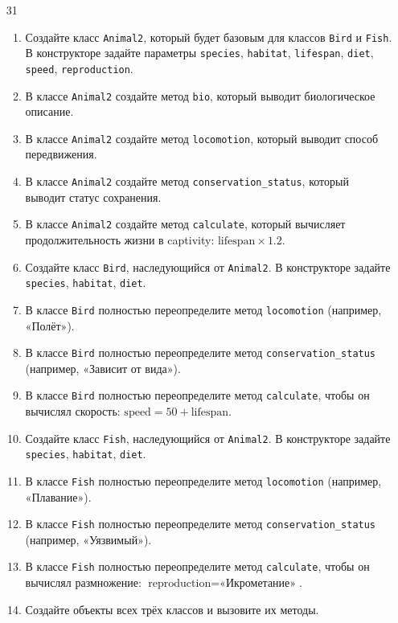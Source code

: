 \begin{enumerate}
\begin{enumerate}
\end{enumerate}
\item[31]
\begin{enumerate}
    \item Создайте класс \texttt{Animal2}, который будет базовым для классов \texttt{Bird} и \texttt{Fish}. В конструкторе задайте параметры \texttt{species}, \texttt{habitat}, \texttt{lifespan}, \texttt{diet}, \texttt{speed}, \texttt{reproduction}.
    \item В классе \texttt{Animal2} создайте метод \texttt{bio}, который выводит биологическое описание.
    \item В классе \texttt{Animal2} создайте метод \texttt{locomotion}, который выводит способ передвижения.
    \item В классе \texttt{Animal2} создайте метод \texttt{conservation\_status}, который выводит статус сохранения.
    \item В классе \texttt{Animal2} создайте метод \texttt{calculate}, который вычисляет продолжительность жизни в captivity: \( \text{lifespan} \times 1.2 \).
    \item Создайте класс \texttt{Bird}, наследующийся от \texttt{Animal2}. В конструкторе задайте \texttt{species}, \texttt{habitat}, \texttt{diet}.
    \item В классе \texttt{Bird} полностью переопределите метод \texttt{locomotion} (например, «Полёт»).
    \item В классе \texttt{Bird} полностью переопределите метод \texttt{conservation\_status} (например, «Зависит от вида»).
    \item В классе \texttt{Bird} полностью переопределите метод \texttt{calculate}, чтобы он вычислял скорость: \( \text{speed} = 50 + \text{lifespan} \).
    \item Создайте класс \texttt{Fish}, наследующийся от \texttt{Animal2}. В конструкторе задайте \texttt{species}, \texttt{habitat}, \texttt{diet}.
    \item В классе \texttt{Fish} полностью переопределите метод \texttt{locomotion} (например, «Плавание»).
    \item В классе \texttt{Fish} полностью переопределите метод \texttt{conservation\_status} (например, «Уязвимый»).
    \item В классе \texttt{Fish} полностью переопределите метод \texttt{calculate}, чтобы он вычислял размножение: \( \text{reproduction} = \text{«Икрометание»} \).
    \item Создайте объекты всех трёх классов и вызовите их методы.

\end{enumerate}
\end{enumerate}
